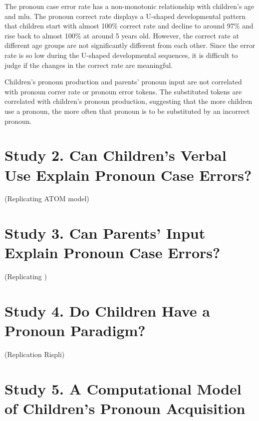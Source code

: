 The pronoun case error rate has a non-monotonic relationship with children's age and mlu. The pronoun correct rate displays a U-shaped developmental pattern that children start with almost 100\% correct rate and decline to around 97\% and rise back to almost 100\% at around 5 years old. However, the correct rate at different age groups are not significantly different from each other. Since the error rate is so low during the U-shaped developmental sequences, it is difficult to judge if the changes in the correct rate are meaningful. 

Children's pronoun production and parents' pronoun input are not correlated with pronoun correr rate or pronoun error tokens. The substituted tokens are correlated with children's pronoun production, suggesting that the more children use a pronoun, the more often that pronoun is to be substituted by an incorrect pronoun. 

\section{Study 2. Can Children's Verbal Use Explain Pronoun Case Errors?}
(Replicating ATOM model)
\section{Study 3. Can Parents' Input Explain Pronoun Case Errors?}
(Replicating \cite{kirjavainen2009can})
\section{Study 4. Do Children Have a Pronoun Paradigm?}
(Replication Rispli)
\section{Study 5. A Computational Model of Children's Pronoun Acquisition}